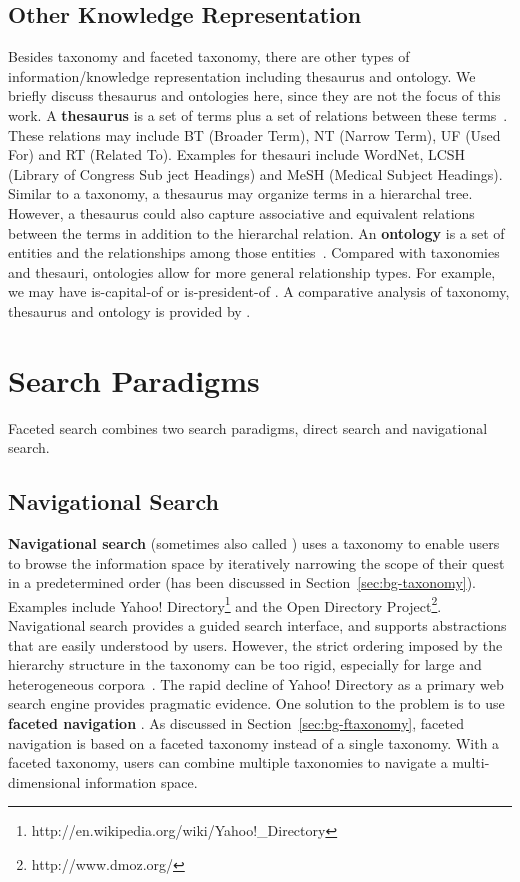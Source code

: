 \subsection{Other Knowledge Representation}
Besides taxonomy and faceted taxonomy, there are other types of information/knowledge representation including thesaurus and ontology. We briefly discuss thesaurus and ontologies here, since they are not the focus of this work.
A \textbf{thesaurus} is a set of terms plus a set of relations between these terms~\cite{jing1994association}. These relations may include BT (Broader Term), NT (Narrow Term), UF (Used For) and RT (Related To). Examples for thesauri include WordNet, LCSH (Library of Congress Sub ject Headings) and MeSH (Medical Subject Headings). Similar to a taxonomy, a thesaurus may organize terms in a hierarchal tree. However, a thesaurus could also capture associative and equivalent relations between the terms in addition to the hierarchal relation. An \textbf{ontology} is a set of entities and the relationships among those entities~\cite{gruber1993translation}. Compared with taxonomies and thesauri, ontologies allow for more general relationship types. For example, we may
have  is-capital-of  or  is-president-of . A comparative analysis of taxonomy, thesaurus and ontology is provided by \citet{kumar2013comparative}.


\section{Search Paradigms}
Faceted search combines two search paradigms, direct search and navigational search. 
\subsection{Navigational Search}
\label{sec:bg-nsearch}
\textbf{Navigational search} (sometimes also called ) uses a taxonomy to enable users to browse the information space by iteratively narrowing the scope of their quest in a predetermined order (has been discussed in Section~\ref{sec:bg-taxonomy}). Examples include Yahoo! Directory\footnote{http://en.wikipedia.org/wiki/Yahoo!\_Directory} and the Open Directory Project\footnote{http://www.dmoz.org/}. Navigational search provides a guided search interface, and supports abstractions that are easily understood by users. However, the strict ordering imposed by the hierarchy structure in the taxonomy can be too rigid, especially for large and heterogeneous corpora~\cite{snow2006semantic,tunkelang2009faceted,sacco2009dynamic}. 
The rapid decline of Yahoo! Directory as a primary web search engine provides pragmatic evidence.
One solution to the problem is to use \textbf{faceted navigation} . As discussed in Section~\ref{sec:bg-ftaxonomy}, faceted navigation is based on a faceted taxonomy instead of a single taxonomy. With a faceted taxonomy, users can combine multiple taxonomies to navigate a multi-dimensional information space.

